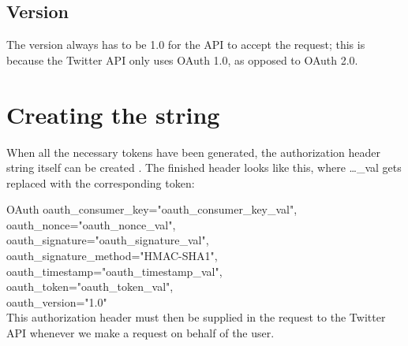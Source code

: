 
\subsection*{Version}
The version always has to be 1.0 for the API to accept the request; this is
because the Twitter \ac{API} only uses OAuth 1.0, as opposed to OAuth 2.0.

\section{Creating the string}
When all the necessary tokens have been generated, the authorization header
string itself can be created \citep{TwitterAPIAuth}. The finished header looks like this, where
\ldots\_val gets replaced with the corresponding token:\nl

OAuth oauth\_consumer\_key="oauth\_consumer\_key\_val",\\
oauth\_nonce="oauth\_nonce\_val", \\
oauth\_signature="oauth\_signature\_val", \\
oauth\_signature\_method="HMAC-SHA1", \\
oauth\_timestamp="oauth\_timestamp\_val", \\
oauth\_token="oauth\_token\_val", \\
oauth\_version="1.0" \\

This authorization header must then be supplied in the request to the Twitter
API whenever we make a request on behalf of the user.

